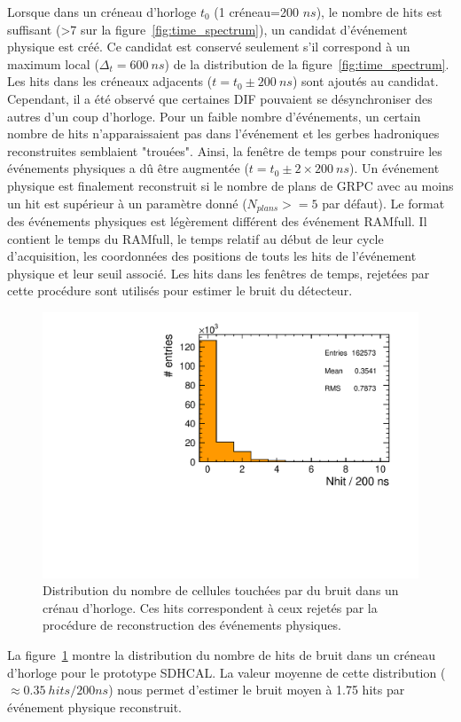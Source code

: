 Lorsque dans un créneau d'horloge $t_0$ (1 créneau=200 $ns$), le nombre de hits est suffisant (>7 sur la figure~\ref{fig:time_spectrum}), un candidat d'événement physique est créé. Ce candidat est conservé seulement s'il correspond à un maximum local ($\Delta_t=600~ns$) de la distribution de la figure~\ref{fig:time_spectrum}. Les hits dans les créneaux adjacents ($t=t_0\pm200~ns$) sont ajoutés au candidat. Cependant, il a été observé que certaines DIF pouvaient se désynchroniser des autres d'un coup d'horloge. Pour un faible nombre d'événements, un certain nombre de hits n'apparaissaient pas dans l'événement et les gerbes hadroniques reconstruites semblaient "trouées". Ainsi, la fenêtre de temps pour construire les événements physiques a dû être augmentée ($t=t_0\pm 2\times200~ns$). Un événement physique est finalement reconstruit si le nombre de plans de GRPC avec au moins un hit est supérieur à un paramètre donné ($N_{plans}>=5$ par défaut). Le format des événements physiques est légèrement différent des événement RAMfull. Il contient le temps du RAMfull, le temps relatif au début de leur cycle d'acquisition, les coordonnées des positions de touts les hits de l'événement physique et leur seuil associé. Les hits dans les fenêtres de temps, rejetées par cette procédure sont utilisés pour estimer le bruit du détecteur. 
\begin{figure}[!ht]
  \begin{center}
    \includegraphics[width=.9\textwidth]{SDHCAL/figs/time_hit_sprectrum_all_centered_R715651_T28.pdf}
    \caption{Distribution du nombre de cellules touchées par du bruit dans un crénau d'horloge. Ces hits correspondent à ceux rejetés par la procédure de reconstruction des événements physiques.}
    \label{fig:noise_spectrum}
  \end{center}
\end{figure}
La figure~\ref{fig:noise_spectrum} montre la distribution du nombre de hits de bruit dans un créneau d'horloge pour le prototype SDHCAL. La valeur moyenne de cette distribution ($\approx 0.35~hits/200ns$) nous permet d'estimer le bruit moyen à 1.75 hits par événement physique reconstruit. 
